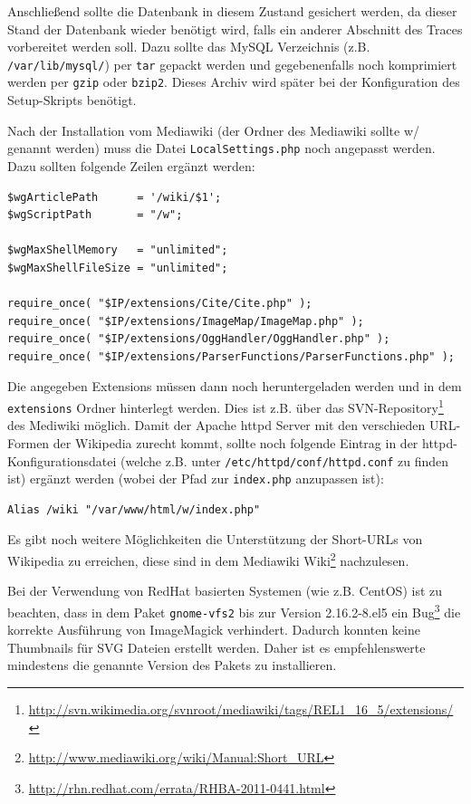 Anschließend sollte die Datenbank in diesem Zustand gesichert werden, da dieser Stand der Datenbank wieder benötigt wird, falls ein anderer Abschnitt des Traces vorbereitet werden soll. Dazu sollte das MySQL Verzeichnis (z.B. \texttt{/var/lib/mysql/}) per \texttt{tar} gepackt werden und gegebenenfalls noch komprimiert werden per \texttt{gzip} oder \texttt{bzip2}. Dieses Archiv wird später bei der Konfiguration des Setup-Skripts benötigt.

Nach der Installation vom Mediawiki (der Ordner des Mediawiki sollte \glqq{}w/\grqq{} genannt werden) muss die Datei \texttt{LocalSettings.php} noch angepasst werden. Dazu sollten folgende Zeilen ergänzt werden:
\begin{verbatim}
$wgArticlePath      = '/wiki/$1';
$wgScriptPath       = "/w";

$wgMaxShellMemory   = "unlimited";
$wgMaxShellFileSize = "unlimited";

require_once( "$IP/extensions/Cite/Cite.php" );
require_once( "$IP/extensions/ImageMap/ImageMap.php" );
require_once( "$IP/extensions/OggHandler/OggHandler.php" );
require_once( "$IP/extensions/ParserFunctions/ParserFunctions.php" );
\end{verbatim}
Die angegeben Extensions müssen dann noch heruntergeladen werden und in dem \texttt{extensions} Ordner hinterlegt werden. Dies ist z.B. über das SVN-Repository\footnote{\url{http://svn.wikimedia.org/svnroot/mediawiki/tags/REL1_16_5/extensions/}} des Mediwiki möglich. Damit der Apache httpd Server mit den verschieden URL-Formen der Wikipedia zurecht kommt, sollte noch folgende Eintrag in der httpd-Konfigurationsdatei (welche z.B. unter  \texttt{/etc/httpd/conf/httpd.conf} zu finden ist) ergänzt werden (wobei der Pfad zur \texttt{index.php} anzupassen ist):
\begin{verbatim}
Alias /wiki "/var/www/html/w/index.php"
\end{verbatim}
Es gibt noch weitere Möglichkeiten die Unterstützung der Short-URLs von Wikipedia zu erreichen, diese sind in dem Mediawiki Wiki\footnote{\url{http://www.mediawiki.org/wiki/Manual:Short_URL}} nachzulesen.

Bei der Verwendung von RedHat basierten Systemen (wie z.B. CentOS) ist zu beachten, dass in dem Paket \texttt{gnome-vfs2} bis zur Version 2.16.2-8.el5 ein Bug\footnote{\url{http://rhn.redhat.com/errata/RHBA-2011-0441.html}} die korrekte Ausführung von ImageMagick verhindert. Dadurch konnten keine Thumbnails für SVG Dateien erstellt werden. Daher ist es empfehlenswerte mindestens die genannte Version des Pakets zu installieren.

